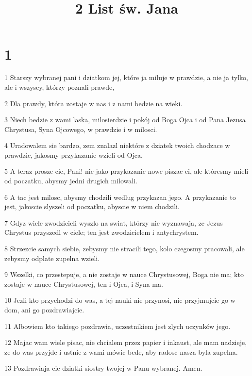 

\title{2 List św. Jana}


\chapter{1}

\par 1 Starszy wybranej pani i dziatkom jej, które ja miluje w prawdzie, a nie ja tylko, ale i wszyscy, którzy poznali prawde,
\par 2 Dla prawdy, która zostaje w nas i z nami bedzie na wieki.
\par 3 Niech bedzie z wami laska, milosierdzie i pokój od Boga Ojca i od Pana Jezusa Chrystusa, Syna Ojcowego, w prawdzie i w milosci.
\par 4 Uradowalem sie bardzo, zem znalazl niektóre z dziatek twoich chodzace w prawdzie, jakosmy przykazanie wzieli od Ojca.
\par 5 A teraz prosze cie, Pani! nie jako przykazanie nowe piszac ci, ale któresmy mieli od poczatku, abysmy jedni drugich milowali.
\par 6 A tac jest milosc, abysmy chodzili wedlug przykazan jego. A przykazanie to jest, jakoscie slyszeli od poczatku, abyscie w niem chodzili.
\par 7 Gdyz wiele zwodzicieli wyszlo na swiat, którzy nie wyznawaja, ze Jezus Chrystus przyszedl w ciele; ten jest zwodzicielem i antychrystem.
\par 8 Strzezcie samych siebie, zebysmy nie stracili tego, kolo czegosmy pracowali, ale zebysmy odplate zupelna wzieli.
\par 9 Wszelki, co przestepuje, a nie zostaje w nauce Chrystusowej, Boga nie ma; kto zostaje w nauce Chrystusowej, ten i Ojca, i Syna ma.
\par 10 Jezli kto przychodzi do was, a tej nauki nie przynosi, nie przyjmujcie go w dom, ani go pozdrawiajcie.
\par 11 Albowiem kto takiego pozdrawia, uczestnikiem jest zlych uczynków jego.
\par 12 Majac wam wiele pisac, nie chcialem przez papier i inkaust, ale mam nadzieje, ze do was przyjde i ustnie z wami mówic bede, aby radosc nasza byla zupelna.
\par 13 Pozdrawiaja cie dziatki siostry twojej w Panu wybranej. Amen.


